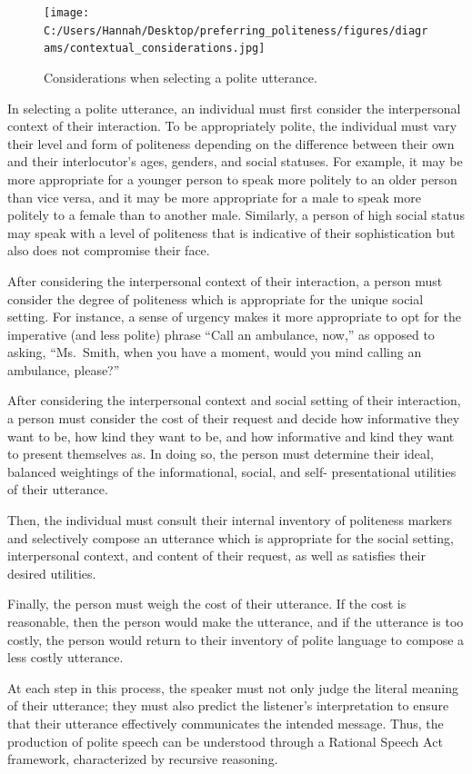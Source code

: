 \documentclass[
  english,
  man,floatsintext]{apa6}
\begin{document}
\begin{figure}
\centering
\texttt{[image: C:/Users/Hannah/Desktop/preferring\_politeness/figures/diagrams/contextual\_considerations.jpg]}
\caption{Considerations when selecting a polite utterance.}
\end{figure}

In selecting a polite utterance, an individual must first consider the interpersonal context of their interaction. To be appropriately polite, the individual must vary their level and form of politeness depending on the difference between their own and their interlocutor's ages, genders, and social statuses. For example, it may be more appropriate for a younger person to speak more politely to an older person than vice versa, and it may be more appropriate for a male to speak more politely to a female than to another male. Similarly, a person of high social status may speak with a level of politeness that is indicative of their sophistication but also does not compromise their face.

After considering the interpersonal context of their interaction, a person must consider the degree of politeness which is appropriate for the unique social setting. For instance, a sense of urgency makes it more appropriate to opt for the imperative (and less polite) phrase ``Call an ambulance, now,'' as opposed to asking, ``Ms.~Smith, when you have a moment, would you mind calling an ambulance, please?''

After considering the interpersonal context and social setting of their interaction, a person must consider the cost of their request and decide how informative they want to be, how kind they want to be, and how informative and kind they want to present themselves as. In doing so, the person must determine their ideal, balanced weightings of the informational, social, and self- presentational utilities of their utterance.

Then, the individual must consult their internal inventory of politeness markers and selectively compose an utterance which is appropriate for the social setting, interpersonal context, and content of their request, as well as satisfies their desired utilities.

Finally, the person must weigh the cost of their utterance. If the cost is reasonable, then the person would make the utterance, and if the utterance is too costly, the person would return to their inventory of polite language to compose a less costly utterance.

At each step in this process, the speaker must not only judge the literal meaning of their utterance; they must also predict the listener's interpretation to ensure that their utterance effectively communicates the intended message. Thus, the production of polite speech can be understood through a Rational Speech Act framework, characterized by recursive reasoning.
\end{document}
